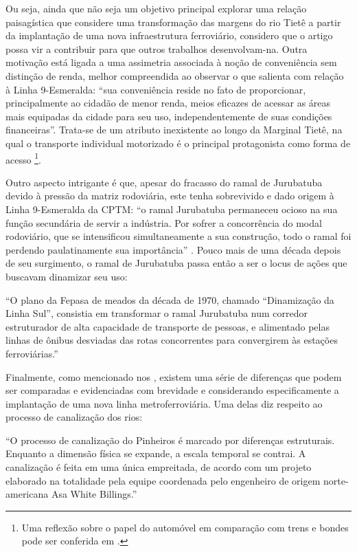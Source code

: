 \documentclass[
	12pt,				%
	openright,			%
	oneside,
	a4paper,			%
	english,			%
	french,				%
	spanish,			%
	brazil,				%
	]{abntex2}
\begin{document}
Ou seja, ainda que não seja um objetivo principal explorar uma relação paisagística que considere uma transformação das margens do rio Tietê a partir da implantação de uma nova infraestrutura ferroviário, considero que o artigo possa vir a contribuir para que outros trabalhos desenvolvam-na. Outra motivação está ligada a uma assimetria associada à noção de conveniência sem distinção de renda, melhor compreendida ao observar o que  salienta com relação à Linha 9-Esmeralda: ``sua conveniência reside no fato de proporcionar, principalmente ao cidadão de menor renda, meios eficazes de acessar as áreas mais equipadas da cidade para seu uso, independentemente de suas condições financeiras''. Trata-se de um atributo inexistente ao longo da Marginal Tietê, na qual o transporte individual motorizado é o principal protagonista como forma de acesso \footnote{Uma reflexão sobre o papel do automóvel em comparação com trens e bondes pode ser conferida em \cite[p.147--149]{franco2005a}.}.

Outro aspecto intrigante é que, apesar do fracasso do ramal de Jurubatuba devido à pressão da matriz rodoviária, este tenha sobrevivido e dado origem à Linha 9-Esmeralda da CPTM: ``o ramal Jurubatuba permaneceu ocioso na sua função secundária de servir a indústria. Por sofrer a concorrência do modal rodoviário, que se intensificou simultaneamente a sua construção, todo o ramal foi perdendo paulatinamente sua importância'' \cite[p.141]{requena2016a}. Pouco mais de uma década depois de seu surgimento, o ramal de Jurubatuba passa então a ser o locus de ações que buscavam dinamizar seu uso:

\begin{citacao}
	``O plano da Fepasa de meados da década de 1970, chamado ``Dinamização da Linha Sul'', consistia em transformar o ramal Jurubatuba num corredor estruturador de alta capacidade de transporte de pessoas, e alimentado pelas linhas de ônibus desviadas das rotas concorrentes para convergirem às estações ferroviárias.'' \cite[p.143]{requena2016a}
\end{citacao}

Finalmente, como mencionado nos , existem uma série de diferenças que podem ser comparadas e evidenciadas com brevidade e considerando especificamente a implantação de uma nova linha metroferroviária. Uma delas diz respeito ao processo de canalização dos rios:

\begin{citacao}
	``O processo de canalização do Pinheiros é marcado por diferenças estruturais. Enquanto a dimensão física se expande, a escala temporal se contrai. A canalização é feita em uma única empreitada, de acordo com um projeto elaborado na totalidade pela equipe coordenada pelo engenheiro de origem norte-americana Asa White Billings.'' \cite[p.58]{franco2005a}
\end{citacao}
\end{document}
